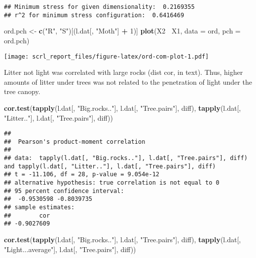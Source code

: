 \documentclass[]{article}
\newenvironment{Shaded}{\begin{snugshade}}{\end{snugshade}}
\newcommand{\KeywordTok}[1]{\textcolor[rgb]{0.13,0.29,0.53}{\textbf{#1}}}
\newcommand{\DataTypeTok}[1]{\textcolor[rgb]{0.13,0.29,0.53}{#1}}
\newcommand{\DecValTok}[1]{\textcolor[rgb]{0.00,0.00,0.81}{#1}}
\newcommand{\StringTok}[1]{\textcolor[rgb]{0.31,0.60,0.02}{#1}}
\newcommand{\OperatorTok}[1]{\textcolor[rgb]{0.81,0.36,0.00}{\textbf{#1}}}
\newcommand{\NormalTok}[1]{#1}
\begin{document}
\begin{verbatim}
## Minimum stress for given dimensionality:  0.2169355 
## r^2 for minimum stress configuration:  0.6416469
\end{verbatim}

\begin{Shaded}
\begin{Highlighting}[]
\NormalTok{ord.pch <-}\StringTok{ }\KeywordTok{c}\NormalTok{(}\StringTok{"R"}\NormalTok{, }\StringTok{"S"}\NormalTok{)[(l.dat[, }\StringTok{"Moth"}\NormalTok{] }\OperatorTok{+}\StringTok{ }\DecValTok{1}\NormalTok{)]}
\KeywordTok{plot}\NormalTok{(X2}\OperatorTok{~}\StringTok{ }\NormalTok{X1, }\DataTypeTok{data =}\NormalTok{ ord, }\DataTypeTok{pch =}\NormalTok{ ord.pch)}
\end{Highlighting}
\end{Shaded}

\texttt{[image: scrl\_report\_files/figure-latex/ord-com-plot-1.pdf]}

Litter not light was correlated with large rocks (dist cor, in text).
Thus, higher amounts of litter under trees was not related to the
penetration of light under the tree canopy.

\begin{Shaded}
\begin{Highlighting}[]
\KeywordTok{cor.test}\NormalTok{(}\KeywordTok{tapply}\NormalTok{(l.dat[, }\StringTok{"Big.rocks.."}\NormalTok{], l.dat[, }\StringTok{"Tree.pairs"}\NormalTok{], diff),}
         \KeywordTok{tapply}\NormalTok{(l.dat[, }\StringTok{"Litter.."}\NormalTok{], l.dat[, }\StringTok{"Tree.pairs"}\NormalTok{], diff))}
\end{Highlighting}
\end{Shaded}

\begin{verbatim}
## 
##  Pearson's product-moment correlation
## 
## data:  tapply(l.dat[, "Big.rocks.."], l.dat[, "Tree.pairs"], diff) and tapply(l.dat[, "Litter.."], l.dat[, "Tree.pairs"], diff)
## t = -11.106, df = 28, p-value = 9.054e-12
## alternative hypothesis: true correlation is not equal to 0
## 95 percent confidence interval:
##  -0.9530598 -0.8039735
## sample estimates:
##        cor 
## -0.9027609
\end{verbatim}

\begin{Shaded}
\begin{Highlighting}[]
\KeywordTok{cor.test}\NormalTok{(}\KeywordTok{tapply}\NormalTok{(l.dat[, }\StringTok{"Big.rocks.."}\NormalTok{], l.dat[, }\StringTok{"Tree.pairs"}\NormalTok{], diff),}
         \KeywordTok{tapply}\NormalTok{(l.dat[, }\StringTok{"Light...average"}\NormalTok{], l.dat[, }\StringTok{"Tree.pairs"}\NormalTok{], diff))}
\end{Highlighting}
\end{Shaded}
\end{document}
